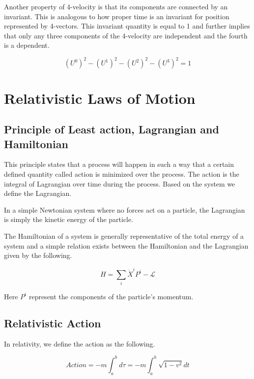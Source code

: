 \documentclass[12pt]{article}
\numberwithin{equation}{section}
\theoremstyle{plain}
\theoremstyle{definition}
\begin{document}
Another property of 4-velocity is that its components are connected by an invariant. This is analogous to how proper time is an invariant for position represented by 4-vectors. This invariant quantity is equal to 1 and further implies that only any three components of the 4-velocity are independent and the fourth is a dependent.

\begin{equation}
    (U^0)^2 - (U^1)^2 - (U^2)^2 - (U^3)^2 = 1
    \label{eq:4vel-invariant}
\end{equation}

\section{Relativistic Laws of Motion}

\subsection{Principle of Least action, Lagrangian and Hamiltonian}

This principle states that a process will happen in such a way that a certain defined quantity called action is minimized over the process. The action is the integral of Lagrangian over time during the process. Based on the system we define the Lagrangian.

In a simple Newtonian system where no forces act on a particle, the Lagrangian is simply the kinetic energy of the particle.

The Hamiltonian of a system is generally representative of the total energy of a system and a simple relation exists between the Hamiltonian and the Lagrangian given by the following.

\begin{equation}
    H = \sum_i \dot X^i P^i - \mathcal{L}
    \label{eq:ham-lag}
\end{equation}

Here $P^i$ represent the components of the particle's momentum.

\subsection{Relativistic Action}

In relativity, we define the action as the following.

\begin{equation}
    Action = -m \int_a^b d\tau = -m \int_a^b \sqrt{1-v^2} dt
    \label{eq:rel-action}
\end{equation}
\end{document}
